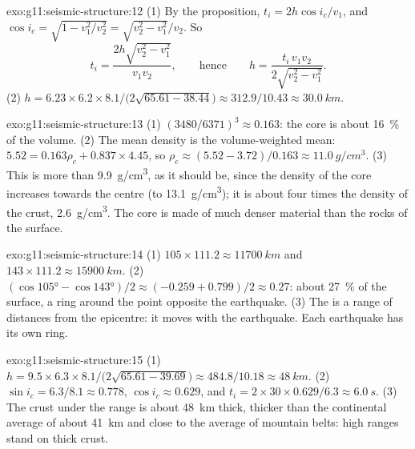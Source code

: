 \begin{solution}{exo:g11:seismic-structure:12}
(1) By the proposition, $t_i = 2h\cos i_c/v_1$, and $\cos i_c = \sqrt{1 -
v_1^2/v_2^2} = \sqrt{v_2^2 - v_1^2}/v_2$. So
\[
  t_i = \frac{2h\sqrt{v_2^2 - v_1^2}}{v_1 v_2},
  \qquad\text{hence}\qquad
  h = \frac{t_i\,v_1 v_2}{2\sqrt{v_2^2 - v_1^2}}.
\]
(2) $h = 6.23 \times 6.2 \times 8.1/\bigl(2\sqrt{65.61 -
38.44}\bigr) \approx 312.9/10.43 \approx \qty{30.0}{km}$.
\end{solution}

\begin{solution}{exo:g11:seismic-structure:13}
(1) $(3480/6371)^3 \approx 0.163$: the core is about \qty{16}{\percent} of
the volume. (2) The mean density is the volume-weighted mean: $5.52 = 0.163
\rho_c + 0.837 \times 4.45$, so $\rho_c \approx (5.52 - 3.72)/0.163 \approx
\qty{11.0}{g/cm^3}$. (3) This is more than \qty{9.9}{g/cm^3}, as it should
be, since the density of the core increases towards the centre (to
\qty{13.1}{g/cm^3}); it is about four times the density of the crust,
\qty{2.6}{g/cm^3}. The core is made of much denser material than the rocks
of the surface.
\end{solution}

\begin{solution}{exo:g11:seismic-structure:14}
(1) $105 \times 111.2 \approx \qty{11700}{km}$ and $143 \times 111.2 \approx
\qty{15900}{km}$. (2) $(\cos\ang{105} - \cos\ang{143})/2 \approx (-0.259 +
0.799)/2 \approx 0.27$: about \qty{27}{\percent} of the surface, a ring around
the point opposite the earthquake. (3) The  is a range of
distances from the epicentre: it moves with the earthquake. Each earthquake
has its own ring.
\end{solution}

\begin{solution}{exo:g11:seismic-structure:15}
(1) $h = 9.5 \times 6.3 \times 8.1/\bigl(2\sqrt{65.61 - 39.69}\bigr) \approx
484.8/10.18 \approx \qty{48}{km}$. (2) $\sin i_c = 6.3/8.1 \approx 0.778$,
$\cos i_c \approx 0.629$, and $t_i = 2 \times 30 \times 0.629/6.3 \approx
\qty{6.0}{s}$. (3) The crust under the range is about \qty{48}{km} thick,
thicker than the continental average of about \qty{41}{km} and close to the
average of mountain belts: high ranges stand on thick crust.
\end{solution}


